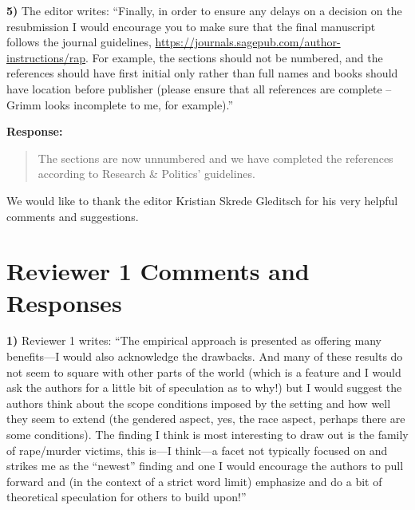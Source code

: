 \documentclass[a4paper,12pt]{article}
\begin{document}
\begin{quote}
\end{quote}

\vspace{.3cm}

\noindent \textbf{5)} The editor writes: ``Finally, in order to ensure any
delays on a decision on the resubmission I would encourage you to make sure
that the final manuscript follows the journal guidelines,
\url{https://journals.sagepub.com/author-instructions/rap}. For example, the
sections should not be numbered, and the references should have first initial
only rather than full names and books should have location before publisher
(please ensure that all references are complete – Grimm looks incomplete to me,
for example).''

\noindent \textbf{Response:} 
\begin{quote}

The sections are now unnumbered and we have completed the references according
to Research \& Politics' guidelines.

\end{quote}

\vspace{.3cm}

We would like to thank the editor Kristian Skrede Gleditsch for his very
helpful comments and suggestions.

\section*{Reviewer 1 Comments and Responses}

\noindent \textbf{1)} Reviewer 1 writes: ``The empirical approach is presented
as offering many benefits---I would also acknowledge the drawbacks. And many of
these results do not seem to square with other parts of the world (which is a
feature and I would ask the authors for a little bit of speculation as to why!)
but I would suggest the authors think about the scope conditions imposed by the
setting and how well they seem to extend (the gendered aspect, yes, the race
aspect, perhaps there are some conditions). The finding I think is most
interesting to draw out is the family of rape/murder victims, this is—I think—a
facet not typically focused on and strikes me as the ``newest'' finding and one
I would encourage the authors to pull forward and (in the context of a strict
word limit) emphasize and do a bit of theoretical speculation for others to
build upon!''

\vspace{.3cm}
\end{document}
